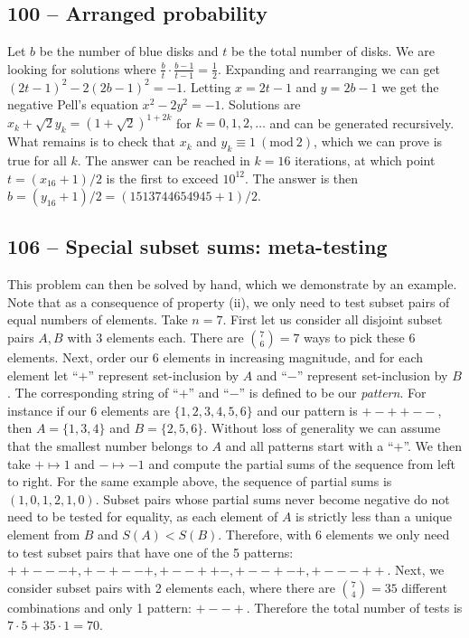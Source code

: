 \documentclass{article}
\newcommand{\Mod}[1]{\ (\mathrm{mod}\ #1)}
\begin{document}
\subsection*{100 -- Arranged probability}
Let $b$ be the number of blue disks and $t$ be the total number of disks.
We are looking for solutions where $\frac{b}{t} \cdot \frac{b-1}{t-1} = \frac{1}{2}$.
Expanding and rearranging we can get $(2t-1)^2 - 2(2b-1)^2 = -1$.
Letting $x = 2t-1$ and $y = 2b-1$ we get the negative Pell's equation $x^2 - 2y^2 = -1$.
Solutions are $x_k + \sqrt{2} y_k = (1+\sqrt{2})^{1 + 2k}$ for $k = 0, 1, 2, \dotsc$ and can be generated recursively.
What remains is to check that $x_k$ and $y_k \equiv 1 \Mod{2}$, which we can prove is true for all $k$.
The answer can be reached in $k=16$ iterations, at which point $t = (x_{16}+1)/2$ is the first to exceed $10^{12}$.
The answer is then $b = (y_{16} + 1)/2 =  \boxed{(1513744654945 + 1)/2}$.


\subsection*{106 -- Special subset sums: meta-testing}
This problem can then be solved by hand, which we demonstrate by an example.
Note that as a consequence of property (ii), we only need to test subset pairs of equal numbers of elements.
Take $n=7$.
First let us consider all disjoint subset pairs $A, B$ with 3 elements each.
There are $\binom{7}{6} = 7$ ways to pick these 6 elements.
Next, order our 6 elements in increasing magnitude, and for each element let ``$+$'' represent set-inclusion by $A$ and ``$-$'' represent set-inclusion by $B$.
The corresponding string of ``$+$'' and ``$-$'' is defined to be our \textit{pattern}.
For instance if our 6 elements are $\{1, 2, 3, 4, 5, 6\}$ and our pattern is $+-++--$, then $A = \{1, 3, 4\}$ and $B = \{2, 5, 6\}$.
Without loss of generality we can assume that the smallest number belongs to $A$ and all patterns start with a ``$+$''.
We then take $+ \mapsto 1$ and $- \mapsto -1$ and compute the partial sums of the sequence from left to right.
For the same example above, the sequence of partial sums is $(1, 0, 1, 2, 1, 0)$.
Subset pairs whose partial sums never become negative do not need to be tested for equality, as each element of $A$ is strictly less than a unique element from $B$ and $S(A) < S(B)$.
Therefore, with 6 elements we only need to test subset pairs that have one of the 5 patterns: $++---+, +-+--+, +--++-, +--+-+, +---++$.
Next, we consider subset pairs with 2 elements each, where there are $\binom{7}{4}=35$ different combinations and only 1 pattern: $+--+$.
Therefore the total number of tests is $7\cdot5 + 35\cdot1 = 70$.\\
\end{document}
